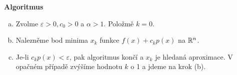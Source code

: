 \textbf{Algoritmus}
\begin{enumerate}[(a)]
    \item Zvolme $\varepsilon > 0, c_0 > 0$ a $\alpha > 1$. Položmě $k = 0$.
    \item Nalezněme bod minima $x_k$ funkce $f(x) + c_k p(x)$ na $\mathbb{R}^n$.
    \item Je-li $c_k p(x) < \varepsilon$, pak algoritmus končí a $x_k$ je hledaná aproximace. V opačném 
    případě zvýšíme hodnotu $k$ o 1 a jdeme na krok (b).
\end{enumerate}